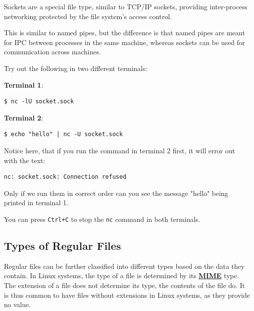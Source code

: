 Sockets are a special file type, similar to TCP/IP sockets, providing inter-process networking protected by the file system's access control.

This is similar to named pipes, but the difference is that named pipes are meant for IPC between processes in the same machine, whereas sockets can be used for communication across machines.

Try out the following in two different terminals:

\textbf{Terminal 1}:
\begin{lstlisting}
$ nc -lU socket.sock
\end{lstlisting}

\textbf{Terminal 2}:
\begin{lstlisting}
$ echo "hello" | nc -U socket.sock
\end{lstlisting}

Notice here, that if you run the command in terminal 2 first, it will error out with the text:
\begin{lstlisting}
nc: socket.sock: Connection refused
\end{lstlisting}

Only if we run them in correct order can you see the message "hello" being printed in terminal 1.

You can press \texttt{Ctrl+C} to stop the \texttt{nc} command in both terminals.

\subsection{Types of Regular Files}

Regular files can be further classified into different types based on the data they contain.
In Linux systems, the type of a file is determined by its \textbf{
  \href{https://developer.mozilla.org/en-US/docs/Web/HTTP/Basics_of_HTTP/MIME_types}{MIME}
} type.
The extension of a file does not determine its type, the contents of the file do.
It is thus common to have files without extensions in Linux systems, as they provide no value.


